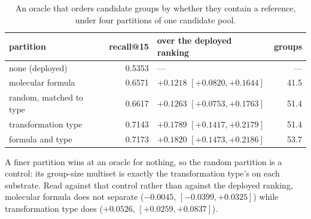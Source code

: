 \begin{table}[h]
\centering\small
\begin{threeparttable}
\caption{An oracle that orders candidate groups by whether they contain a reference, under four partitions of one candidate pool.}
\label{tab:si-oracle}
\begin{tabular}{lrlr}
\toprule
partition & recall@15 & over the deployed ranking & groups \\
\midrule
none (deployed) & 0.5353 & --- & --- \\
molecular formula & 0.6571 & $+0.1218$ $[+0.0820, +0.1644]$ & 41.5 \\
random, matched to type & 0.6617 & $+0.1263$ $[+0.0753, +0.1763]$ & 51.4 \\
transformation type & 0.7143 & $+0.1789$ $[+0.1417, +0.2179]$ & 51.4 \\
formula and type & 0.7173 & $+0.1820$ $[+0.1473, +0.2186]$ & 53.7 \\
\bottomrule
\end{tabular}
\begin{tablenotes}[flushleft]\footnotesize
\item A finer partition wins at an oracle for nothing, so the random partition is a control: its group-size multiset is exactly the transformation type's on each substrate. Read against that control rather than against the deployed ranking, molecular formula does not separate ($-0.0045$, $[-0.0399, +0.0325]$) while transformation type does ($+0.0526$, $[+0.0259, +0.0837]$).
\end{tablenotes}
\end{threeparttable}
\end{table}
